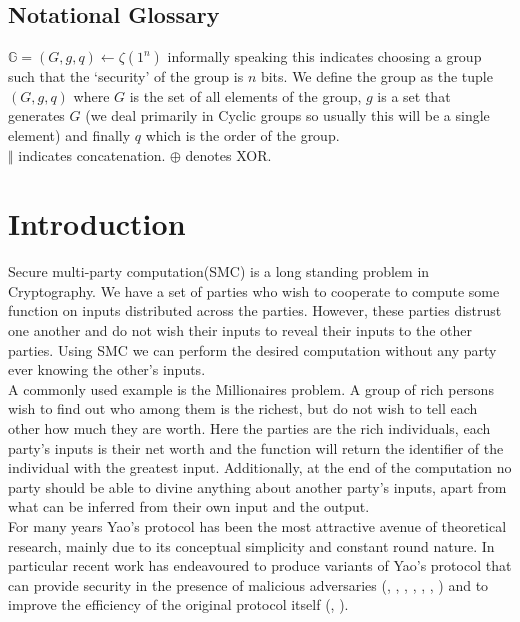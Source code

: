 \documentclass[ %
                    author={Nicholas Tutte},
                supervisor={Prof. Nigel Smart},
                    degree={MEng},
                     title={Secure Two Party Computation},
                  subtitle={A practical comparison of recent protocols},
                      type={Research - GG1K},
                      year={2015} ]{dissertation}
\begin{document}
		\section*{Notational Glossary}
			$\mathbb{G} = (G, g, q) \leftarrow \zeta(1^n)$ informally speaking this indicates choosing a group such that the `security' of the group is $n$ bits. We define the group as the tuple $(G, g, q)$ where $G$ is the set of all elements of the group, $g$ is a set that generates $G$ (we deal primarily in Cyclic groups so usually this will be a single element) and finally $q$ which is the order of the group.\\

			$\Vert$ indicates concatenation. $\oplus$ denotes XOR.\\

	\tableofcontents

	
	\chapter{Introduction}
		Secure multi-party computation(SMC) is a long standing problem in Cryptography. We have a set of parties who wish to cooperate to compute some function on inputs distributed across the parties. However, these parties distrust one another and do not wish their inputs to reveal their inputs to the other parties. Using SMC we can perform the desired computation without any party ever knowing the other's inputs.\\

		A commonly used example is the Millionaires problem. A group of rich persons wish to find out who among them is the richest, but do not wish to tell each other how much they are worth. Here the parties are the rich individuals, each party's inputs is their net worth and the function will return the identifier of the individual with the greatest input. Additionally, at the end of the computation no party should be able to divine anything about another party's inputs, apart from what can be inferred from their own input and the output.\\

		For many years Yao's protocol \cite{YaoOriginal} has been the most attractive avenue of theoretical research, mainly due to its conceptual simplicity and constant round nature. In particular recent work has endeavoured to produce variants of Yao's protocol that can provide security in the presence of malicious adversaries (\cite{LindellAndPinkas2007}, \cite{LindellAndPinkas2011}, \cite{Lindell_CnC_2013}, \cite{Katz_Symm_CnC_2013}, \cite{OnCommittedInputs}, \cite{LEGO_Paper}, \cite{MiniLEGO}) and to improve the efficiency of the original protocol itself (\cite{SMC_Is_Practical}, \cite{FreeXOR}).\\
\end{document}
